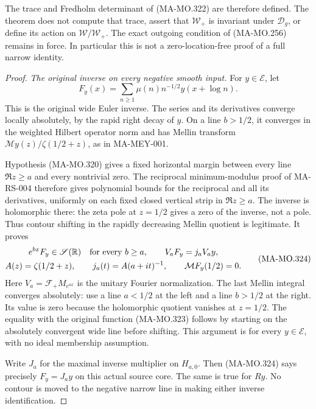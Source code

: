 The trace and Fredholm determinant of (MA-MO.322) are therefore
defined. The theorem does not compute that trace, assert that
\(\mathcal W_+\) is invariant under \(\mathscr D_g\), or
define its action on \(\mathcal W/\mathcal W_+\). The exact
outgoing condition of (MA-MO.256) remains in force. In
particular this is not a zero-location-free proof of a full
narrow identity.

\begin{proof}
\emph{The original inverse on every negative smooth input.}
For \(y\in\mathcal E\), let
\[
 F_y(x)=\sum_{n\ge1}\mu(n)n^{-1/2}y(x+\log n).
 \tag{MA-MO.323}
\]
This is the original wide Euler inverse. The series and its
derivatives converge locally absolutely, by the rapid right
decay of \(y\). On a line \(b>1/2\), it converges in the
weighted Hilbert operator norm and has Mellin transform
\(\mathcal My(z)/\zeta(1/2+z)\), as in MA-MEY-001.

Hypothesis (MA-MO.320) gives a fixed horizontal margin
between every line \(\Re z\ge a\) and every nontrivial
zero. The reciprocal minimum-modulus proof of MA-RS-004
therefore gives polynomial bounds for the reciprocal and
all its derivatives, uniformly on each fixed closed vertical
strip in \(\Re z\ge a\). The inverse is holomorphic there:
the zeta pole at \(z=1/2\) gives a zero of the inverse,
not a pole. Thus contour shifting in the rapidly decreasing
Mellin quotient is legitimate. It proves
\[
 \begin{gathered}
 e^{bx}F_y\in\mathscr S(\mathbb R)\quad\hbox{for every }b\ge a,
 \qquad
 V_aF_y=j_aV_ay,\\
 A(z)=\zeta(1/2+z),\qquad j_a(t)=A(a+it)^{-1},\qquad
 \mathcal MF_y(1/2)=0.
 \end{gathered}
 \tag{MA-MO.324}
\]
Here \(V_a=\mathcal F_+M_{e^{ax}}\) is the unitary
Fourier normalization. The last Mellin integral converges
absolutely: use a line \(a<1/2\) at the left and a line
\(b>1/2\) at the right. Its value is zero because the
holomorphic quotient vanishes at \(z=1/2\). The equality
with the original function (MA-MO.323) follows by starting
on the absolutely convergent wide line before shifting.
This argument is for every \(y\in\mathcal E\), with no
ideal membership assumption.

Write \(J_a\) for the maximal inverse multiplier on
\(H_{a,0}\). Then (MA-MO.324) says precisely
\(F_y=J_ay\) on this actual source core. The same is true
for \(Ry\). No contour is moved to the negative narrow
line in making either inverse identification.


\end{proof}
